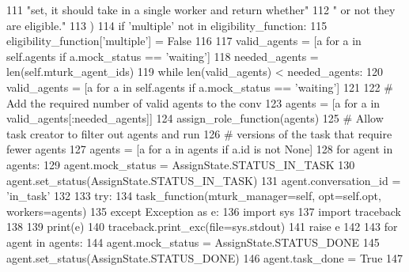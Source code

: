 \begin{DoxyCode}
111                     \textcolor{stringliteral}{"set, it should take in a single worker and return whether"}
112                     \textcolor{stringliteral}{" or not they are eligible."}
113                 )
114             \textcolor{keywordflow}{if} \textcolor{stringliteral}{'multiple'} \textcolor{keywordflow}{not} \textcolor{keywordflow}{in} eligibility\_function:
115                 eligibility\_function[\textcolor{stringliteral}{'multiple'}] = \textcolor{keyword}{False}
116 
117         valid\_agents = [a \textcolor{keywordflow}{for} a \textcolor{keywordflow}{in} self.agents \textcolor{keywordflow}{if} a.mock\_status == \textcolor{stringliteral}{'waiting'}]
118         needed\_agents = len(self.mturk\_agent\_ids)
119         \textcolor{keywordflow}{while} len(valid\_agents) < needed\_agents:
120             valid\_agents = [a \textcolor{keywordflow}{for} a \textcolor{keywordflow}{in} self.agents \textcolor{keywordflow}{if} a.mock\_status == \textcolor{stringliteral}{'waiting'}]
121 
122         \textcolor{comment}{# Add the required number of valid agents to the conv}
123         agents = [a \textcolor{keywordflow}{for} a \textcolor{keywordflow}{in} valid\_agents[:needed\_agents]]
124         assign\_role\_function(agents)
125         \textcolor{comment}{# Allow task creator to filter out agents and run}
126         \textcolor{comment}{# versions of the task that require fewer agents}
127         agents = [a \textcolor{keywordflow}{for} a \textcolor{keywordflow}{in} agents \textcolor{keywordflow}{if} a.id \textcolor{keywordflow}{is} \textcolor{keywordflow}{not} \textcolor{keywordtype}{None}]
128         \textcolor{keywordflow}{for} agent \textcolor{keywordflow}{in} agents:
129             agent.mock\_status = AssignState.STATUS\_IN\_TASK
130             agent.set\_status(AssignState.STATUS\_IN\_TASK)
131             agent.conversation\_id = \textcolor{stringliteral}{'in\_task'}
132 
133         \textcolor{keywordflow}{try}:
134             task\_function(mturk\_manager=self, opt=self.opt, workers=agents)
135         \textcolor{keywordflow}{except} Exception \textcolor{keyword}{as} e:
136             \textcolor{keyword}{import} sys
137             \textcolor{keyword}{import} traceback
138 
139             print(e)
140             traceback.print\_exc(file=sys.stdout)
141             \textcolor{keywordflow}{raise} e
142 
143         \textcolor{keywordflow}{for} agent \textcolor{keywordflow}{in} agents:
144             agent.mock\_status = AssignState.STATUS\_DONE
145             agent.set\_status(AssignState.STATUS\_DONE)
146             agent.task\_done = \textcolor{keyword}{True}
147 
\end{DoxyCode}
